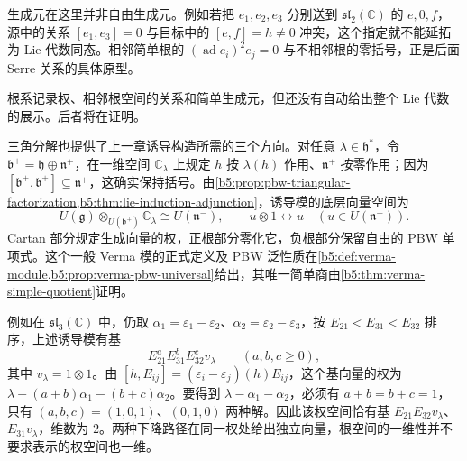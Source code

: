 生成元在这里并非自由生成元。例如若把 \(e_1,e_2,e_3\) 分别送到 \(\mathfrak{sl}_2(\mathbb C)\) 的 \(e,0,f\)，源中的关系 \([e_1,e_3]=0\) 与目标中的 \([e,f]=h\ne0\) 冲突，这个指定就不能延拓为 Lie 代数同态。相邻简单根的 \((\operatorname{ad}e_i)^2e_j=0\) 与不相邻根的零括号，正是后面 Serre 关系的具体原型。

\ProseParagraphBreak
根系记录权、相邻根空间的关系和简单生成元，但还没有自动给出整个 Lie 代数的展示。后者将在证明。

\ProseParagraphBreak
三角分解也提供了上一章诱导构造所需的三个方向。对任意 \(\lambda\in\mathfrak h^*\)，令 \(\mathfrak b^+=\mathfrak h\oplus\mathfrak n^+\)，在一维空间 \(\mathbb C_\lambda\) 上规定 \(h\) 按 \(\lambda(h)\) 作用、\(\mathfrak n^+\) 按零作用；因为 \([\mathfrak b^+,\mathfrak b^+]\subseteq\mathfrak n^+\)，这确实保持括号。由\cref{b5:prop:pbw-triangular-factorization,b5:thm:lie-induction-adjunction}，诱导模的底层向量空间为
\[
	U(\mathfrak g)\otimes_{U(\mathfrak b^+)}\mathbb C_\lambda \cong U(\mathfrak n^-),\qquad u\otimes1\longleftrightarrow u\quad(u\in U(\mathfrak n^-)).
\]
Cartan 部分规定生成向量的权，正根部分零化它，负根部分保留自由的 PBW 单项式。这个一般 Verma 模的正式定义及 PBW 泛性质在\cref{b5:def:verma-module,b5:prop:verma-pbw-universal}给出，其唯一简单商由\cref{b5:thm:verma-simple-quotient}证明。

\ProseParagraphBreak
例如在 \(\mathfrak{sl}_3(\mathbb C)\) 中，仍取 \(\alpha_1=\varepsilon_1-\varepsilon_2\)、\(\alpha_2=\varepsilon_2-\varepsilon_3\)，按 \(E_{21}<E_{31}<E_{32}\) 排序，上述诱导模有基
\[
	E_{21}^aE_{31}^bE_{32}^c v_\lambda\qquad(a,b,c\ge0),
\]
其中 \(v_\lambda=1\otimes1\)。由 \([h,E_{ij}]=(\varepsilon_i-\varepsilon_j)(h)E_{ij}\)，这个基向量的权为 \(\lambda-(a+b)\alpha_1-(b+c)\alpha_2\)。要得到 \(\lambda-\alpha_1-\alpha_2\)，必须有 \(a+b=b+c=1\)，只有 \((a,b,c)=(1,0,1)\)、\((0,1,0)\) 两种解。因此该权空间恰有基 \(E_{21}E_{32}v_\lambda\)、\(E_{31}v_\lambda\)，维数为 \(2\)。两种下降路径在同一权处给出独立向量，根空间的一维性并不要求表示的权空间也一维。
